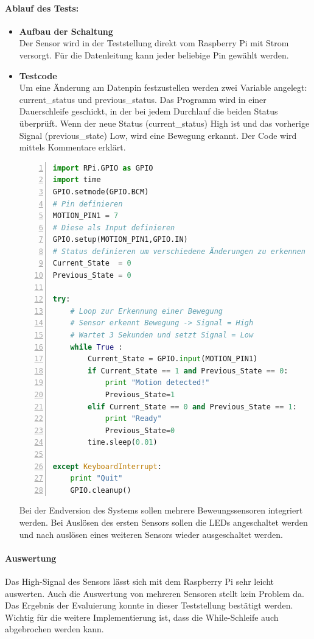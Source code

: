\paragraph{Ablauf des Tests:}
\begin{itemize}
\item \textbf{Aufbau der Schaltung} \\
Der Sensor wird in der Teststellung direkt vom Raspberry Pi mit Strom versorgt. Für die Datenleitung kann jeder beliebige Pin gewählt werden. 
\item \textbf{Testcode} \\
Um eine Änderung am Datenpin festzustellen werden zwei Variable angelegt: current\_status und previous\_status. Das Programm wird in einer Dauerschleife geschickt, in der bei jedem Durchlauf die beiden Status überprüft. Wenn der neue Status (current\_status) High ist und das vorherige Signal (previous\_state) Low, wird eine Bewegung erkannt. Der Code wird mittels Kommentare erklärt.	

\begin{lstlisting}[caption = Testcode zur Bewegungserkennung mit Sensor, language=python, frame=single, breaklines=true,columns=fullflexible, commentstyle=\color{gray}\upshape, captionpos=b, numbers = left]
import RPi.GPIO as GPIO
import time
GPIO.setmode(GPIO.BCM)
# Pin definieren
MOTION_PIN1 = 7
# Diese als Input definieren
GPIO.setup(MOTION_PIN1,GPIO.IN)
# Status definieren um verschiedene Änderungen zu erkennen
Current_State  = 0
Previous_State = 0

try:
	# Loop zur Erkennung einer Bewegung
	# Sensor erkennt Bewegung -> Signal = High
	# Wartet 3 Sekunden und setzt Signal = Low
	while True :
		Current_State = GPIO.input(MOTION_PIN1)
		if Current_State == 1 and Previous_State == 0:
			print "Motion detected!"
			Previous_State=1
		elif Current_State == 0 and Previous_State == 1:
			print "Ready"
			Previous_State=0
		time.sleep(0.01)
	
except KeyboardInterrupt:
	print "Quit"
	GPIO.cleanup()
\end{lstlisting}

Bei der Endversion des Systems sollen mehrere Beweungssensoren integriert werden. Bei Auslösen des ersten Sensors sollen die LEDs angeschaltet werden und nach auslösen eines weiteren Sensors wieder ausgeschaltet werden.  
\end{itemize}

\paragraph{Auswertung}
Das High-Signal des Sensors lässt sich mit dem Raspberry Pi sehr leicht auswerten. Auch die Auswertung von mehreren Sensoren stellt kein Problem da. Das Ergebnis der Evaluierung konnte in dieser Teststellung bestätigt werden. Wichtig für die weitere Implementierung ist, dass die While-Schleife auch abgebrochen werden kann. 

